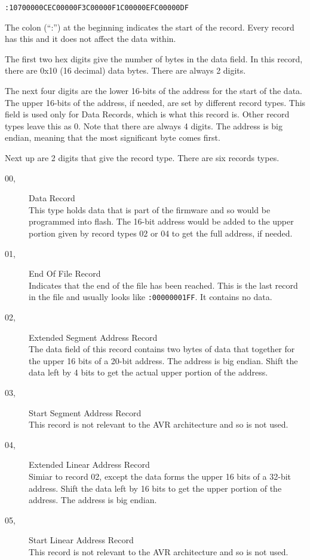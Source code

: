 \documentclass{article}
\begin{document}
\texttt{:10700000CEC00000F3C00000F1C00000EFC00000DF}

The colon (``:'') at the beginning indicates the start of the record.  Every record has this and it
does not affect the data within.

The first two hex digits give the number of bytes in the data field.  In this record, there are 0x10
(16 decimal) data bytes.  There are always 2 digits.

The next four digits are the lower 16-bits of the address for the start of the data.  The upper
16-bits of the address, if needed, are set by different record types.  This field is used only for
Data Records, which is what this record is.  Other record types leave this as 0.  Note that there
are always 4 digits.  The address is big endian, meaning that the most significant byte comes first.

Next up are 2 digits that give the record type.  There are six records types.

\begin{description}
  \item[00,] Data Record \\
    This type holds data that is part of the firmware and so would be programmed into flash.  The
    16-bit address would be added to the upper portion given by record types 02 or 04 to get the
    full address, if needed.
  \item[01,] End Of File Record \\
    Indicates that the end of the file has been reached.  This is the last record in the file and
    usually looks like \texttt{:00000001FF}.  It contains no data.
  \item[02,] Extended Segment Address Record \\
    The data field of this record contains two bytes of data that together for the upper 16 bits of
    a 20-bit address.  The address is big endian.  Shift the data left by 4 bits to get the actual
    upper portion of the address.
  \item[03,] Start Segment Address Record \\
    This record is not relevant to the AVR architecture and so is not used.
  \item[04,] Extended Linear Address Record \\
    Simiar to record 02, except the data forms the upper 16 bits of a 32-bit address.  Shift the
    data left by 16 bits to get the upper portion of the address.  The address is big endian.
  \item[05,] Start Linear Address Record \\
    This record is not relevant to the AVR architecture and so is not used.
\end{description}
\end{document}

